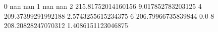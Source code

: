 0 nan nan
1 nan nan
2 215.81752014160156 9.017852783203125
4 209.37399291992188 2.5743255615234375
6 206.79966735839844 0.0
8 208.20828247070312 1.4086151123046875
